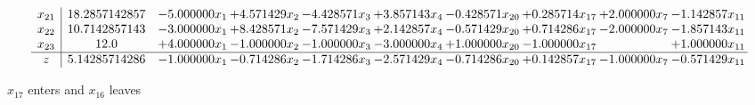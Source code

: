 \documentclass[10pt]{article}
\begin{document}
\[\begin{array}{c| c c@{\hskip 2pt} c@{\hskip 2pt} c@{\hskip 2pt} c@{\hskip 2pt} c@{\hskip 2pt} c@{\hskip 2pt} c@{\hskip 2pt} c@{\hskip 2pt} }
 x_{21}   &  18.2857142857 & -5.000000 x_{1} & + 4.571429 x_{2} & -4.428571 x_{3} & + 3.857143 x_{4} & -0.428571 x_{20} & + 0.285714 x_{17} & + 2.000000 x_{7} & -1.142857 x_{11}\\
 x_{22}   &  10.7142857143 & -3.000000 x_{1} & + 8.428571 x_{2} & -7.571429 x_{3} & + 2.142857 x_{4} & -0.571429 x_{20} & + 0.714286 x_{17} & -2.000000 x_{7} & -1.857143 x_{11}\\
 x_{23}   &  12.0 & + 4.000000 x_{1} & -1.000000 x_{2} & -1.000000 x_{3} & -3.000000 x_{4} & + 1.000000 x_{20} & -1.000000 x_{17} &   & + 1.000000 x_{11}\\
\hline
z    &  5.14285714286 & -1.000000 x_{1} & -0.714286 x_{2} & -1.714286 x_{3} & -2.571429 x_{4} & -0.714286 x_{20} & + 0.142857 x_{17} & -1.000000 x_{7} & -0.571429 x_{11}\\
\end{array}\]


 $ x_{17} $ enters and $ x_{16} $ leaves 
\end{document}
